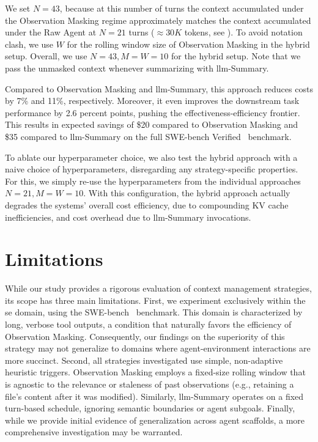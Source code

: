 \documentclass{article}
\begin{document}
We set $N=43$, because at this number of turns the context accumulated under the Observation Masking regime approximately matches the context accumulated under the Raw Agent at $N=21$ turns ($\approx30K$ tokens, see ). To avoid notation clash, we use $W$ for the rolling window size of Observation Masking in the hybrid setup. Overall, we use $N=43,M=W=10$ for the hybrid setup. Note that we pass the unmasked context whenever summarizing with \ac{llm}-Summary.

Compared to Observation Masking and \ac{llm}-Summary, this approach reduces costs by 7\% and 11\%, respectively. Moreover, it even improves the downstream task performance by 2.6 percent points, pushing the effectiveness-efficiency frontier. This results in expected savings of \$20 compared to Observation Masking and \$35 compared to \ac{llm}-Summary on the full SWE-bench Verified~\cite{openai_swe_bench_verified_2024} benchmark.

To ablate our hyperparameter choice, we also test the hybrid approach with a naive choice of hyperparameters, disregarding any strategy-specific properties. For this, we simply re-use the hyperparameters from the individual approaches $N=21,M=W=10$. With this configuration, the hybrid approach actually degrades the systems' overall cost efficiency, due to compounding KV cache inefficiencies, and cost overhead due to \ac{llm}-Summary invocations.

\section{Limitations}
\label{sec:limitations}
While our study provides a rigorous evaluation of context management strategies, its scope has three main limitations. First, we experiment exclusively within the \ac{se} domain, using the SWE-bench~\cite{jimenez2024swebench} benchmark. This domain is characterized by long, verbose tool outputs, a condition that naturally favors the efficiency of Observation Masking. Consequently, our findings on the superiority of this strategy may not generalize to domains where agent-environment interactions are more succinct.
Second, all strategies investigated use simple, non-adaptive heuristic triggers. Observation Masking employs a fixed-size rolling window that is agnostic to the relevance or staleness of past observations (e.g., retaining a file's content after it was modified). Similarly, \ac{llm}-Summary operates on a fixed turn-based schedule, ignoring semantic boundaries or agent subgoals. Finally, while we provide initial evidence of generalization across agent scaffolds, a more comprehensive investigation may be warranted.
\end{document}
